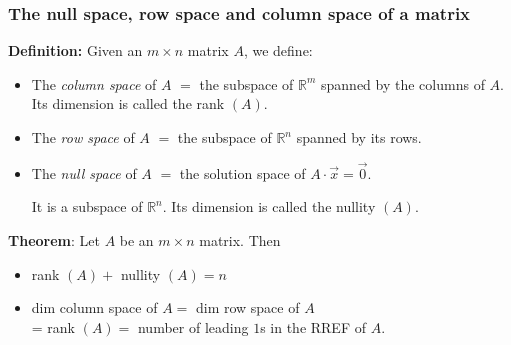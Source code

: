 \begin{frame}[fragile]
\frametitle{The null space, row space and column space of a matrix}

\textbf{Definition:} Given an $m \times n$ matrix $A$, we define:

\begin{itemize}

\item The {\em column space} of $A$ $ = $ the subspace of $\mathbb{R}^m$ spanned by the columns of $A$. Its dimension is called the rank $(A)$. 

\item The {\em row space} of $A$ $ = $ the subspace of $\mathbb{R}^n$ spanned by its rows. 

\item The {\em null space} of $A$ $ = $ the solution space of $A \cdot \vec{x} = \vec{0}$.

It is a subspace of $\mathbb{R}^n$. Its dimension is called the nullity $(A)$.

\end{itemize} 

\textbf{Theorem}: Let $A$ be an $m \times n$ matrix. Then

\begin{itemize}

\item rank $(A) + $ nullity $(A) = n$

\item dim column space of $A = $ dim row space of $A $\\ = rank $(A) = $  number of leading $1$s in the RREF of $A$. 

\end{itemize} 

\end{frame}

